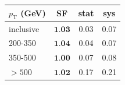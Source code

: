 \begin{table}[htbH]
  \begin{center}
  \begin{tabular}{  l | c  | c | c  }
  \hline
  \hline
     $p_\text{T}$ (GeV) & \textbf{SF} &stat & sys \\ \midrule
     \hline
inclusive & $\textbf{1.03}$ & 0.03 & 0.07\\ \hline
200-350 & $\textbf{1.04}$ & 0.04 & 0.07\\ \hline
350-500 & $\textbf{1.00}$ & 0.07 & 0.08\\ \hline
$>500$ & $\textbf{1.02}$ & 0.17 & 0.21\\ 
     \hline
     \hline
  \end{tabular}
  \end{center}
  \label{tab:Doubleb_FitParameters2}
\end{table}
